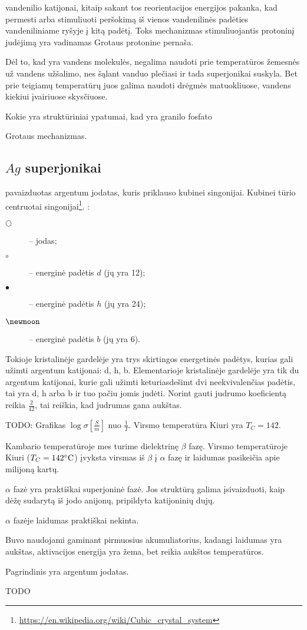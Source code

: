 vandenilio katijonai, kitaip sakant tos reorientacijos energijos
pakanka, kad permesti arba stimuliuoti peršokimą iš vienos
vandenilinės padėties vandeniliniame ryšyje į kitą padėtį. Toks
mechanizmas stimuliuojantis protoninį judėjimą yra vadinamas
Grotaus protonine pernaša.

Dėl to, kad yra vandens molekulės, negalima naudoti prie temperatūros
žemesnės už vandens užšalimo, nes šąlant vanduo plečiasi ir tada
superjonikai suskyla. Bet prie teigiamų temperatūrų juos galima
naudoti drėgmės matuokliuose, vandens kiekiui įvairiuose skysčiuose.

\begin{remember}
  \item Kokie yra struktūriniai ypatumai, kad yra granilo fosfato
  \item Grotaus mechanizmas.
\end{remember}

\subsection{$Ag$ superjonikai}

 pavaizduotas argentum jodatas, kuris priklauso kubinei
singonijai. Kubinei tūrio centruotai singonijai\footnote{
\url{https://en.wikipedia.org/wiki/Cubic_crystal_system}}.
:
\begin{description}
  \item[$\bigcirc$] – jodas;
  \item[$\circ$] – energinė padėtis $d$ (jų yra 12);
  \item[$\bullet$] – energinė padėtis $h$ (jų yra 24);
  \item[$\newmoon$] – energinė padėtis $b$ (jų yra 6).
\end{description}
Tokioje kristalinėje gardelėje yra trys skirtingos energetinės padėtys,
kurias gali užimti argentum katijonai: d, h, b. Elementarioje kristalinėje
gardelėje yra tik du argentum katijonai, kurie gali užimti keturiasdešimt
dvi neekvivalenčias padėtis, tai yra d, h arba b ir tuo pačiu jomis
judėti. Norint gauti judrumo koeficientą reikia $\frac{2}{42}$, tai
reiškia, kad judrumas gana aukštas. 

TODO: Grafikas $\log \sigma [\frac{S}{m}]$ nuo $\frac{1}{T}$.
Virsmo temperatūra Kiuri yra $T_{C} = 142$.

Kambario temperatūroje mes turime dielektrinę $\beta$ fazę. Virsmo
temperatūroje Kiuri ($T_{C} = 142 \celsius$) įvyksta virsmas iš
$\beta$ į $\alpha$ fazę ir laidumas pasikeičia apie milijoną kartų.

$\alpha$ fazė yra praktiškai superjoninė fazė. Jos struktūrą
galima įsivaizduoti, kaip dėžę sudarytą iš jodo anijonų,
pripildyta katijoninių dujų.

$\alpha$ fazėje laidumas praktiškai nekinta.

Buvo naudojami gaminant pirmuosius akumuliatorius, kadangi laidumas
yra aukštas, aktivacijos energija yra žema, bet reikia aukštos
temperatūros.

\begin{remember}
  \item Pagrindinis yra argentum jodatas.
  \item TODO
\end{remember}
